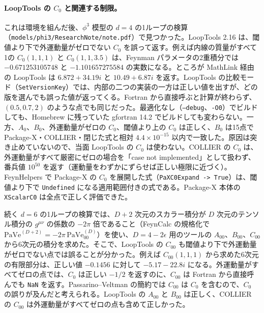 \documentclass[a4paper,10pt]{ltjsarticle}
\newcommand{\bq}{\textasciigrave}
\begin{document}
\paragraph{LoopTools の $C_0$ と関連する制限。}これは環境を組んだ後、$\phi^3$ 模型の $d=4$ の1ループの検算（\nolinkurl{models/phi3/ResearchNote/note.pdf}）で見つかった。LoopTools 2.16 は、閾値より下で外運動量がゼロでない $C_0$ を誤って返す。例えば内線の質量がすべて1の $C_0(1,1,1)$ と $C_0(1,1,3.5)$ は、Feynman パラメータの2重積分では $-0.671253105748$ と $-1.101657275584$ の実数になる。ところが MathLink 経由の LoopTools は $6.872+34.19i$ と $10.49+6.87i$ を返す。LoopTools の比較モード（\texttt{SetVersionKey}）では、内部の二つの実装の一方は正しい値を出すが、どの版を選んでも誤った値が返ってくる。Fortran から直接呼ぶと計算が終わらず、$(0.5,0.7,2)$ のような点でも同じだった。最適化なし（\texttt{--debug}、\texttt{-O0}）でビルドしても、Homebrew に残っていた gfortran 14.2 でビルドしても変わらない。一方、$A_0$、$B_0$、外運動量がゼロの $C_0$、閾値より上の $C_0$ は正しく、$B_0$ は15点で Package-X・COLLIER・閉じた式と相対 $4.4\times10^{-15}$ 以内で一致した。原因は突き止めていないので、当面 LoopTools の $C_0$ は使わない。COLLIER の $C_0$ は、外運動量がすべて厳密にゼロの場合を「case not implemented」として扱わず、番兵値 $10^{50}$ を返す（運動量をわずかにずらせば正しい極限に近づく）。FeynHelpers で Package-X の $C_0$ を展開した式（\texttt{PaXC0Expand -> True}）は、閾値より下で \texttt{Undefined} になる適用範囲付きの式である。Package-X 本体の \texttt{X\bq ScalarC0} は全点で正しく評価できた。

続く $d=6$ の1ループの検算では、$D+2$ 次元のスカラー積分が $D$ 次元のテンソル積分の $g^{\mu\nu}$ の係数の $-2\pi$ 倍であること（FeynCalc の規格化で $\mathrm{PaVe}^{(D+2)}=-2\pi\,\mathrm{PaVe}_{00}^{(D)}$）を使い、$D=4-2\epsilon$ 用のツールの $A_{00}$、$B_{00}$、$C_{00}$ から6次元の積分を求めた。そこで、LoopTools の $C_{00}$ も閾値より下で外運動量がゼロでない点では誤ることが分かった。例えば $C_{00}(1,1,1)$ から求めた6次元の有限部分は、正しい値 $-0.1456$ に対して $-5.17-22.8i$ になる。外運動量がすべてゼロの点では、$C_0$ は正しい $-1/2$ を返すのに、$C_{00}$ は Fortran から直接呼んでも \texttt{NaN} を返す。Passarino--Veltman の簡約では $C_{00}$ は $C_0$ を含むので、$C_0$ の誤りが及んだと考えられる。LoopTools の $A_{00}$ と $B_{00}$ は正しく、COLLIER の $C_{00}$ は外運動量がすべてゼロの点も含めて正しかった。
\end{document}
